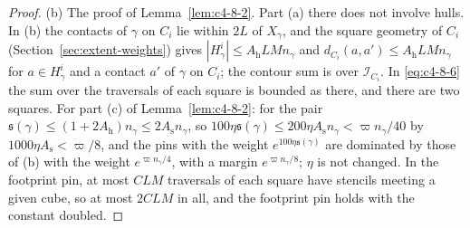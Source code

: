\begin{proof}
(b) The proof of Lemma~\ref{lem:c4-8-2}. Part (a) there does not involve hulls. In (b) the contacts of $\gamma$ on $C_i$ lie within $2L$ of $X_\gamma$, and the square geometry of $C_i$ (Section~\ref{sec:extent-weights}) gives $|H^i_\gamma|\leq A_{\mathrm h}LMn_\gamma$ and $d_{C_i}(a,a')\leq A_{\mathrm h}LMn_\gamma$ for $a\in H^i_\gamma$ and a contact $a'$ of $\gamma$ on $C_i$; the contour sum is over $\mathcal I_{C_i}$. In \eqref{eq:c4-8-6} the sum over the traversals of each square is bounded as there, and there are two squares. For part (c) of Lemma~\ref{lem:c4-8-2}: for the pair $\mathfrak s(\gamma)\leq(1+2A_{\mathrm h})n_\gamma\leq2A_{\mathrm s}n_\gamma$, so $100\eta\mathfrak s(\gamma)\leq200\eta A_{\mathrm s}n_\gamma<\varpi n_\gamma/40$ by $1000\eta A_{\mathrm s}<\varpi/8$, and the pins with the weight $e^{100\eta\mathfrak s(\gamma)}$ are dominated by those of (b) with the weight $e^{\varpi n_\gamma/4}$, with a margin $e^{\varpi n_\gamma/8}$; $\eta$ is not changed. In the footprint pin, at most $CLM$ traversals of each square have stencils meeting a given cube, so at most $2CLM$ in all, and the footprint pin holds with the constant doubled.


\end{proof}
